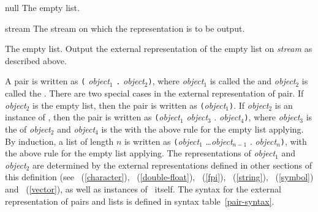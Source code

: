 \begin{optDefinition}
%
\begin{specargs}
    \item[null] The empty list.
    \item[stream] The stream on which the representation is to be output.
\end{specargs}
%
\result%
The empty list.
%
\remarks%
Output the external representation of the empty list on {\em stream\/}
as described above.

%
A pair is written as \verb+(+{\em
    object}$_1$ \verb+.+ {\em object}$_2$\verb+)+, where {\em object}$_1$ is
called the  and {\em object}$_2$ is called the
.  There are two special cases in the external representation
of pair.  If {\em object}$_2$ is the empty list, then the pair is written as
\verb+(+{\em object}$_1$\verb+)+.  If {\em object$_2$} is an instance of
, then the pair is written as \verb+(+{\em object}$_1$ {\em
    object}$_3$ . {\em object$_4$}\verb+)+, where {\em object$_3$} is the
 of {\em object$_2$} and {\em object$_4$} is the
 with the above rule for the empty list applying.  By
induction, a list of length $n$ is written as \verb+(+{\em object}$_1$ \ldots {\em object$_{n-1}$}
. {\em object}$_n$\verb+)+, with the above rule for the empty list applying.
The representations of {\em object$_1$} and {\em object$_2$} are determined by
the external representations defined in other sections of this definition (see
\ (\ref{character}), \
(\ref{double-float}),
\ (\ref{fpi}),
\ (\ref{string}),
\ (\ref{symbol}) and
\ (\ref{vector}), as well as instances of \
itself.  The syntax for the external representation of pairs and lists
is defined in syntax table~\ref{pair-syntax}.


\end{optDefinition}
